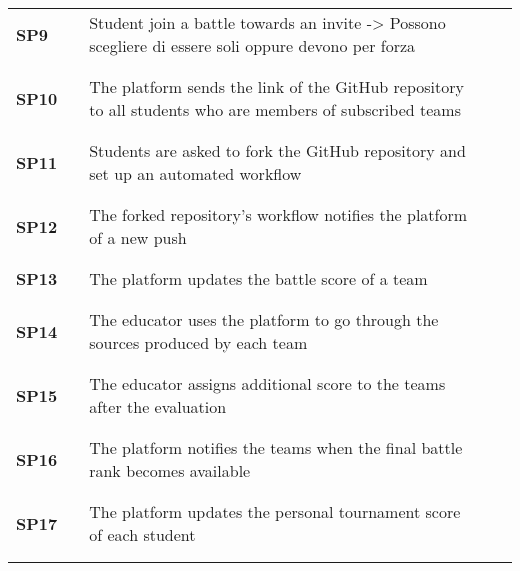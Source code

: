 \begin{longtable}[H]{l l p{8.5cm} l l}
        \textbf{SP9}  & \vline & Student join a battle towards an invite -> Possono scegliere di essere soli oppure devono per forza & \vline & \\
                      & & & & \\\hline & & & & \\
        \textbf{SP10} & \vline & The platform sends the link of the GitHub repository to all students who are members of subscribed teams & \vline & \\
                      & & & & \\\hline & & & & \\
        \textbf{SP11} & \vline & Students are asked to fork the GitHub repository and set up an automated workflow & \vline & \\
                      & & & & \\\hline & & & & \\
        \textbf{SP12} & \vline & The forked repository's workflow notifies the platform of a new push & \vline & \\
                      & & & & \\\hline & & & & \\
        \textbf{SP13} & \vline & The platform updates the battle score of a team & \vline & \\
                      & & & & \\\hline & & & & \\
        \textbf{SP14} & \vline & The educator uses the platform to go through the sources produced by each team & \vline & \\
                      & & & & \\\hline & & & & \\
        \textbf{SP15} & \vline & The educator assigns additional score to the teams after the evaluation & \vline & \\
                      & & & & \\\hline & & & & \\
        \textbf{SP16} & \vline & The platform notifies the teams when the final battle rank becomes available & \vline & \\
                      & & & & \\\hline & & & & \\
        \textbf{SP17} & \vline & The platform updates the personal tournament score of each student & \vline & \\
                      & & & & \\\hline & & & & \\

\end{longtable}
